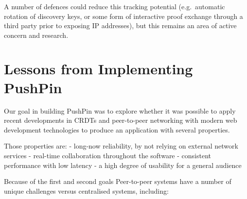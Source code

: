 \documentclass[sigplan,10pt]{acmart}
\begin{document}
A number of defences could reduce this tracking potential (e.g.\ automatic rotation of discovery keys, or some form of interactive proof exchange through a third party prior to exposing IP addresses), but this remains an area of active concern and research.

\section{Lessons from Implementing PushPin}\label{sec:lessons}

Our goal in building PushPin was to explore whether it was possible to apply recent developments in CRDTs and peer-to-peer networking with modern web development technologies to produce an application with several properties.

Those properties are:
 - long-now reliability, by not relying on external network services
 - real-time collaboration throughout the software
 - consistent performance with low latency
 - a high degree of usability for a general audience 

Because of the first and second goals Peer-to-peer systems have a number of unique challenges versus centralised systems, including:
\end{document}
